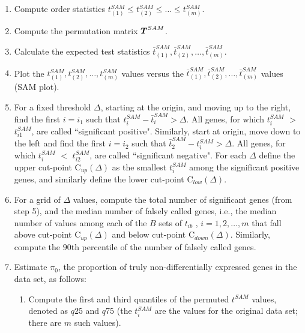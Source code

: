 \documentclass[10pt]{mybook4}
\newcommand{\T}{\mbox{\boldmath $T$}}
\begin{document}
\begin{enumerate}

\item Compute order statistics $t_{(1)}^{SAM} \le t_{(2)}^{SAM} \le
\dots \le t_{(m)}^{SAM}$.

\item Compute the permutation matrix $\T^{SAM}$.

\item Calculate the expected test statistics
$\bar{t}_{(1)}^{SAM},\bar{t}_{(2)}^{SAM},\dots,\bar{t}_{(m)}^{SAM}$.

\item Plot the $t_{(1)}^{SAM} , t_{(2)}^{SAM}, \dots , t_{(m)}^{SAM}$
values versus the
$\bar{t}_{(1)}^{SAM},\bar{t}_{(2)}^{SAM},\dots,\bar{t}_{(m)}^{SAM}$
values (SAM plot).

\item For a fixed threshold $\Delta$, starting at the origin, and
moving up to the right, find the first $i=i_1$ such that
$t_i^{SAM}-\bar{t}_{i}^{SAM} > \Delta$. All genes, for which
$t_i^{SAM}$ $>$ $t_{i1}^{SAM}$, are called ``significant positive".
Similarly, start at origin, move down to the left and find the first
$i=i_2$ such that $\bar{t}_{2}^{SAM}-t_i^{SAM}> \Delta$. All genes,
for which $t_i^{SAM}$ $<$ $t_{i2}^{SAM}$, are called ``significant
negative". For each $\Delta$ define the upper cut-point
C$_{up}(\Delta)$ as the smallest $t_i^{SAM}$ among the significant
positive genes, and similarly define the lower cut-point
C$_{low}(\Delta)$.

\item For a grid of $\Delta$ values, compute the total number of
significant genes (from step 5), and the median number of falsely
called genes, i.e., the median number of values among each of the
$B$ sets of $t_{ib}$ , $i=1,2,\dots,m$ that fall above cut-point
C$_{up}(\Delta)$ and below cut-point C$_{down}(\Delta)$.
Similarly, compute the $90$th percentile of the number of falsely
called genes.

\item Estimate $\pi_0$, the proportion of truly non-differentially
expressed genes in the data set, as follows:

\begin{enumerate}

\item Compute the first and third quantiles of the permuted
$t^{SAM}$ values, denoted as $q25$ and $q75$ (the $t_i^{SAM}$ are
the values for the original data set; there are $m$ such values).


\end{enumerate}
\end{enumerate}
\end{document}
